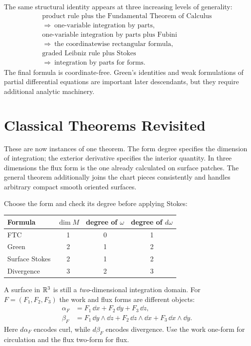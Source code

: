 \begin{remark}
The same structural identity appears at three increasing levels of
generality:
\[
\begin{gathered}
\text{product rule plus the Fundamental Theorem of Calculus}\\
\Longrightarrow\ \text{one-variable integration by parts},\\
\text{one-variable integration by parts plus Fubini}\\
\Longrightarrow\ \text{the coordinatewise rectangular formula},\\
\text{graded Leibniz rule plus Stokes}\\
\Longrightarrow\ \text{integration by parts for forms}.
\end{gathered}
\]
The final formula is coordinate-free.  Green's identities and weak
formulations of partial differential equations are important later
descendants, but they require additional analytic machinery.
\end{remark}

\section{Classical Theorems Revisited}

These are now instances of one theorem. The form degree specifies the
dimension of integration; the exterior derivative specifies the interior
quantity. In three dimensions the flux form is the one already calculated
on surface patches. The general theorem additionally joins the chart pieces
consistently and handles arbitrary compact smooth oriented surfaces.

Choose the form and check its degree before applying Stokes:
\begin{center}
\begin{tabular}{lccc}
Formula & $\dim M$ & degree of $\omega$ & degree of $d\omega$\\\hline
FTC & 1 & 0 & 1\\
Green & 2 & 1 & 2\\
Surface Stokes & 2 & 1 & 2\\
Divergence & 3 & 2 & 3
\end{tabular}
\end{center}
A surface in $\mathbb{R}^3$ is still a \emph{two}-dimensional integration domain.
For $F=(F_1,F_2,F_3)$ the work and flux forms are different objects:
\[
\begin{aligned}
\alpha_F&=F_1\,\dd x+F_2\,\dd y+F_3\,\dd z,\\
\beta_F&=F_1\,\dd y\wedge\dd z+F_2\,\dd z\wedge\dd x
+F_3\,\dd x\wedge\dd y.
\end{aligned}
\]
Here $d\alpha_F$ encodes curl, while $d\beta_F$ encodes divergence.
Use the work one-form for circulation and the flux two-form for flux.

